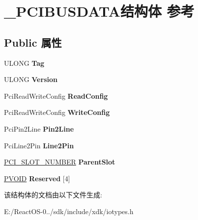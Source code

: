 \hypertarget{struct___p_c_i_b_u_s_d_a_t_a}{}\section{\+\_\+\+P\+C\+I\+B\+U\+S\+D\+A\+T\+A结构体 参考}
\label{struct___p_c_i_b_u_s_d_a_t_a}
\subsection*{Public 属性}
\begin{DoxyCompactItemize}
\item 
\mbox{\label{struct___p_c_i_b_u_s_d_a_t_a_a6e532392863d071faf7d5df6f023bfc1}} 
U\+L\+O\+NG {\bfseries Tag}
\item 
\mbox{\label{struct___p_c_i_b_u_s_d_a_t_a_ae20c652ce4abc1534ca4904439c0fe4d}} 
U\+L\+O\+NG {\bfseries Version}
\item 
\mbox{\label{struct___p_c_i_b_u_s_d_a_t_a_a7d4b16a3be9f1d81270802781e2c3c9e}} 
Pci\+Read\+Write\+Config {\bfseries Read\+Config}
\item 
\mbox{\label{struct___p_c_i_b_u_s_d_a_t_a_a36b3f5d7699ac0c8252f9433a96e3a18}} 
Pci\+Read\+Write\+Config {\bfseries Write\+Config}
\item 
\mbox{\label{struct___p_c_i_b_u_s_d_a_t_a_af51bd243e651cb9d90eb3c5078c0a696}} 
Pci\+Pin2\+Line {\bfseries Pin2\+Line}
\item 
\mbox{\label{struct___p_c_i_b_u_s_d_a_t_a_a5d8a2fd35e8a527dc5fbe074121dc522}} 
Pci\+Line2\+Pin {\bfseries Line2\+Pin}
\item 
\mbox{\label{struct___p_c_i_b_u_s_d_a_t_a_aba17f42b79887e2a398ae30423d5e3e3}} 
\hyperlink{struct___p_c_i___s_l_o_t___n_u_m_b_e_r}{P\+C\+I\+\_\+\+S\+L\+O\+T\+\_\+\+N\+U\+M\+B\+ER} {\bfseries Parent\+Slot}
\item 
\mbox{\label{struct___p_c_i_b_u_s_d_a_t_a_ae490ce9e87bcdf7d17a6da3c16c05549}} 
\hyperlink{interfacevoid}{P\+V\+O\+ID} {\bfseries Reserved} \mbox{[}4\mbox{]}
\end{DoxyCompactItemize}


该结构体的文档由以下文件生成\+:\begin{DoxyCompactItemize}
\item 
E\+:/\+React\+O\+S-\/0../sdk/include/xdk/iotypes.\+h\end{DoxyCompactItemize}
